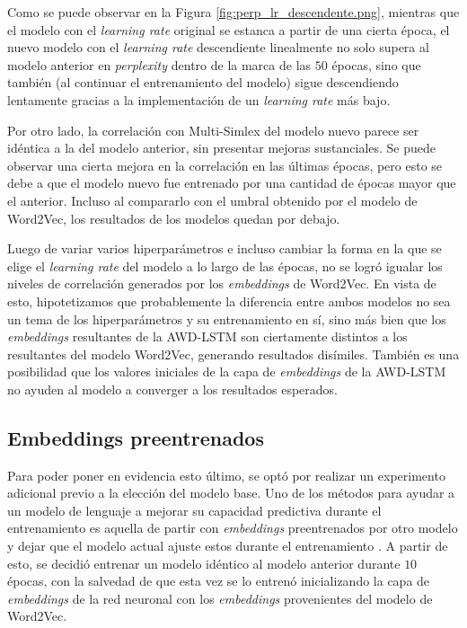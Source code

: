 Como se puede observar en la Figura \ref{fig:perp_lr_descendente.png}, mientras que el modelo con el \textit{learning rate} 
original se estanca a partir de una cierta época, el nuevo modelo con el \textit{learning rate} descendiente 
linealmente no solo supera al modelo anterior en \textit{perplexity} dentro de la marca de las $50$ 
épocas, sino que también (al continuar el entrenamiento del modelo) sigue descendiendo 
lentamente gracias a la implementación de un \textit{learning rate} más bajo.

Por otro lado, la correlación con Multi-Simlex del modelo nuevo parece ser idéntica a 
la del modelo anterior, sin presentar mejoras sustanciales. Se puede observar una cierta 
mejora en la correlación en las últimas épocas, pero esto se debe a que el modelo 
nuevo fue entrenado por una cantidad de épocas mayor que el anterior. Incluso 
al compararlo con el umbral obtenido por el modelo de Word2Vec, los resultados 
de los modelos quedan por debajo.


Luego de variar varios hiperparámetros e incluso cambiar la forma en la que se elige 
el \textit{learning rate} del modelo a lo largo de las épocas, no se logró igualar los 
niveles de correlación generados por los \textit{embeddings} de Word2Vec. En vista de esto, 
hipotetizamos que probablemente la diferencia entre ambos modelos no sea un 
tema de los hiperparámetros y su entrenamiento en sí, sino más bien que los 
\textit{embeddings} resultantes de la AWD-LSTM son ciertamente distintos a los 
resultantes del modelo Word2Vec, generando resultados disímiles. También 
es una posibilidad que los valores iniciales de la capa de \textit{embeddings} 
de la AWD-LSTM no ayuden al modelo a converger a los resultados esperados.

\subsection{Embeddings preentrenados}

Para poder poner en evidencia esto último, se optó por realizar un experimento 
adicional previo a la elección del modelo base. Uno de los métodos para ayudar 
a un modelo de lenguaje a mejorar su capacidad predictiva durante el entrenamiento 
es aquella de partir con \textit{embeddings} preentrenados por otro modelo y dejar que 
el modelo actual ajuste estos durante el entrenamiento \parencite{Wang2020}. A partir de esto, se decidió entrenar un modelo idéntico al modelo anterior 
durante $10$ épocas, con la salvedad de que esta vez se lo entrenó inicializando 
la capa de \textit{embeddings} de la red neuronal con los \textit{embeddings} provenientes 
del modelo de Word2Vec.

